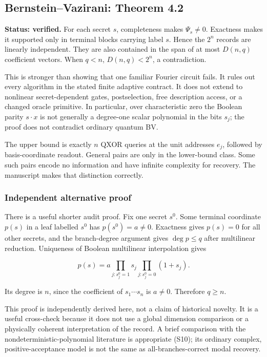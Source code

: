 \documentclass[
  11pt,
]{article}
\begin{document}
\subsection{Bernstein--Vazirani: Theorem
4.2}\label{bernsteinvazirani-theorem-4.2}

\textbf{Status: verified.} For each secret \(s\), completeness makes
\(\Psi_s\ne0\). Exactness makes it supported only in terminal blocks
carrying label \(s\). Hence the \(2^n\) records are linearly
independent. They are also contained in the span of at most \(D(n,q)\)
coefficient vectors. When \(q<n\), \(D(n,q)<2^n\), a contradiction.

This is stronger than showing that one familiar Fourier circuit fails.
It rules out every algorithm in the stated finite adaptive contract. It
does not extend to nonlinear secret-dependent gates, postselection, free
description access, or a changed oracle primitive. In particular, over
characteristic zero the Boolean parity \(s\cdot x\) is not generally a
degree-one scalar polynomial in the bits \(s_j\); the proof does not
contradict ordinary quantum BV.

The upper bound is exactly \(n\) QXOR queries at the unit addresses
\(e_j\), followed by basis-coordinate readout. General pairs are only in
the lower-bound class. Some such pairs encode no information and have
infinite complexity for recovery. The manuscript makes that distinction
correctly.

\subsubsection{Independent alternative
proof}\label{independent-alternative-proof}

There is a useful shorter audit proof. Fix one secret \(s^0\). Some
terminal coordinate \(p(s)\) in a leaf labelled \(s^0\) has
\(p(s^0)=a\ne0\). Exactness gives \(p(s)=0\) for all other secrets, and
the branch-degree argument gives \(\deg p\le q\) after multilinear
reduction. Uniqueness of Boolean multilinear interpolation gives

\[
p(s)=a\prod_{j:s^0_j=1}s_j\prod_{j:s^0_j=0}(1+s_j).
\]

Its degree is \(n\), since the coefficient of \(s_1\cdots s_n\) is
\(a\ne0\). Therefore \(q\ge n\).

This proof is independently derived here, not a claim of historical
novelty. It is a useful cross-check because it does not use a global
dimension comparison or a physically coherent interpretation of the
record. A brief comparison with the nondeterministic-polynomial
literature is appropriate (S10); its ordinary complex,
positive-acceptance model is not the same as all-branches-correct modal
recovery.
\end{document}
